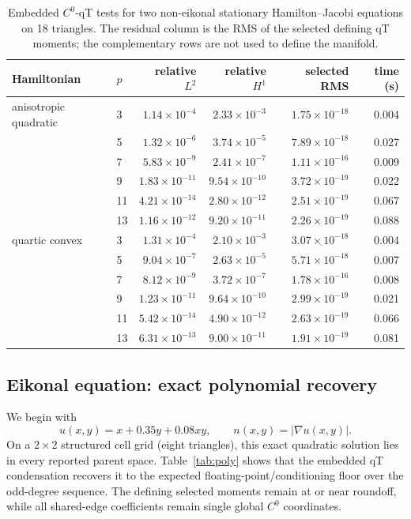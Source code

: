 \documentclass[preprint,12pt]{elsarticle}
\newcommand{\grad}{\nabla}
\newcommand{\abs}[1]{\left\lvert #1\right\rvert}
\begin{document}
\begin{table}[t]
\centering
\caption{Embedded $C^0$-qT tests for two non-eikonal stationary Hamilton--Jacobi equations on 18 triangles.  The residual column is the RMS of the selected defining qT moments; the complementary rows are not used to define the manifold.}
\label{tab:generalHJ}
\begin{tabular}{llrrrr}
\toprule
Hamiltonian & $p$ & relative $L^2$ & relative $H^1$ & selected RMS & time (s)\\
\midrule
anisotropic quadratic &3 &$1.14\times10^{-4}$&$2.33\times10^{-3}$&$1.75\times10^{-18}$&0.004\\
&5 &$1.32\times10^{-6}$&$3.74\times10^{-5}$&$7.89\times10^{-18}$&0.027\\
&7 &$5.83\times10^{-9}$&$2.41\times10^{-7}$&$1.11\times10^{-16}$&0.009\\
&9 &$1.83\times10^{-11}$&$9.54\times10^{-10}$&$3.72\times10^{-19}$&0.022\\
&11&$4.21\times10^{-14}$&$2.80\times10^{-12}$&$2.51\times10^{-19}$&0.067\\
&13&$1.16\times10^{-12}$&$9.20\times10^{-11}$&$2.26\times10^{-19}$&0.088\\
\midrule
quartic convex &3 &$1.31\times10^{-4}$&$2.10\times10^{-3}$&$3.07\times10^{-18}$&0.004\\
&5 &$9.04\times10^{-7}$&$2.63\times10^{-5}$&$5.71\times10^{-18}$&0.007\\
&7 &$8.12\times10^{-9}$&$3.72\times10^{-7}$&$1.78\times10^{-16}$&0.008\\
&9 &$1.23\times10^{-11}$&$9.64\times10^{-10}$&$2.99\times10^{-19}$&0.021\\
&11&$5.42\times10^{-14}$&$4.90\times10^{-12}$&$2.63\times10^{-19}$&0.066\\
&13&$6.31\times10^{-13}$&$9.00\times10^{-11}$&$1.91\times10^{-19}$&0.081\\
\bottomrule
\end{tabular}
\end{table}

\subsection{Eikonal equation: exact polynomial recovery}
We begin with
\[
 u(x,y)=x+0.35y+0.08xy,
 \qquad n(x,y)=\abs{\grad u(x,y)}.
\]
On a $2\times2$ structured cell grid (eight triangles), this exact quadratic solution lies in every reported parent space.  Table~\ref{tab:poly} shows that the embedded qT condensation recovers it to the expected floating-point/conditioning floor over the odd-degree sequence.  The defining selected moments remain at or near roundoff, while all shared-edge coefficients remain single global $C^0$ coordinates.
\end{document}
